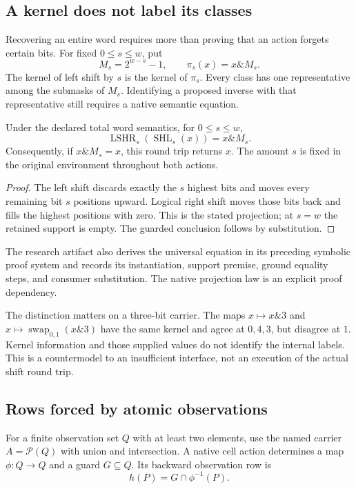 \subsection{A kernel does not label its classes}
Recovering an entire word requires more than proving that an action forgets certain bits. For fixed $0\le s\le w$, put
\[
 M_s=2^{w-s}-1,\qquad \pi_s(x)=x\mathbin{\&}M_s.
\]
The kernel of left shift by $s$ is the kernel of $\pi_s$. Every class has one representative among the submasks of $M_s$. Identifying a proposed inverse with that representative still requires a native semantic equation.

\begin{proposition}\label{prop:restoreword}
Under the declared total word semantics, for $0\le s\le w$,
\[
 \operatorname{LSHR}_s(\operatorname{SHL}_s(x))=x\mathbin{\&}M_s.
\]
Consequently, if $x\mathbin{\&}M_s=x$, this round trip returns $x$. The amount $s$ is fixed in the original environment throughout both actions.
\end{proposition}
\begin{proof}
The left shift discards exactly the $s$ highest bits and moves every remaining bit $s$ positions upward. Logical right shift moves those bits back and fills the highest positions with zero. This is the stated projection; at $s=w$ the retained support is empty. The guarded conclusion follows by substitution.
\end{proof}

The research artifact also derives the universal equation in its preceding symbolic proof system and records its instantiation, support premise, ground equality steps, and consumer substitution. The native projection law is an explicit proof dependency.

The distinction matters on a three-bit carrier. The maps $x\mapsto x\mathbin{\&}3$ and $x\mapsto\operatorname{swap}_{0,1}(x\mathbin{\&}3)$ have the same kernel and agree at $0,4,3$, but disagree at $1$. Kernel information and those supplied values do not identify the internal labels. This is a countermodel to an insufficient interface, not an execution of the actual shift round trip.

\subsection{Rows forced by atomic observations}
For a finite observation set $Q$ with at least two elements, use the named carrier
$A=\mathcal P(Q)$ with union and intersection. A native cell action determines a map $\phi:Q\to Q$ and a guard $G\subseteq Q$. Its backward observation row is
\begin{equation}\label{eq:restrictedpreimage}
 h(P)=G\cap\phi^{-1}(P).
\end{equation}

